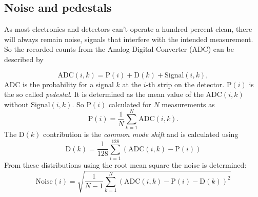 \subsection{Noise and pedestals}
As most electronics and detectors can't operate a hundred percent clean, there will always remain noise, signals that interfere with the intended measurement. So the recorded counts from the Analog-Digital-Converter (ADC) can be described by

\begin{equation}
	\mathrm{ADC}(i,k) = \mathrm{P}(i) + \mathrm{D}(k) + \mathrm{Signal}(i,k),
\end{equation}
ADC is the probability for a signal $k$ at the $i$-th strip on the detector. $\mathrm{P}(i)$ is the so called \textit{pedestal}. It is determined as the mean value of the $\mathrm{ADC}(i,k)$ without $\mathrm{Signal}(i,k)$. So $\mathrm{P}(i)$ calculated for $N$ measurements as 
\begin{equation}
	\mathrm{P}(i) = \frac{1}{N} \sum_{k=1}^{N}\mathrm{ADC}(i,k).
\end{equation}
The $\mathrm{D}(k)$ contribution is the \textit{common mode shift} and is calculated using 
\begin{equation}
	\mathrm{D}(k) = \frac{1}{128}\sum_{i=1}^{128}(\mathrm{ADC}(i,k) - \mathrm{P}(i))
\end{equation}
From these distributions using the root mean square the noise is determined:
\begin{equation}
	\mathrm{Noise}(i)=\sqrt{\frac{1}{N-1}\sum_{k=1}^{N}(\mathrm{ADC}(i,k) - \mathrm{P}(i) - \mathrm{D}(k))^2}
\end{equation}